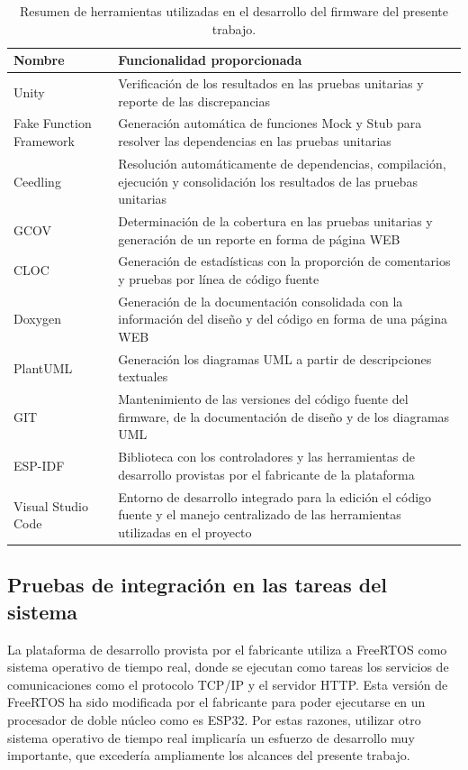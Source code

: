 \begin{table}[ht]
	\centering
	\caption[Herramientas utilizadas para el desarrollo del firmware]{Resumen de herramientas utilizadas en el desarrollo del firmware del presente trabajo.}
	\begin{tabular}{L{25mm} L{100mm}}    
		\toprule
		\textbf{Nombre} & 
		\textbf{Funcionalidad proporcionada} \\
		\midrule
		Unity & 
		Verificación de los resultados en las pruebas unitarias y reporte de las discrepancias \\
		Fake Function Framework &
		Generación automática de funciones Mock y Stub para resolver las dependencias en las pruebas unitarias \\
		Ceedling &
		Resolución automáticamente de dependencias, compilación, ejecución y consolidación los resultados de las pruebas unitarias \\
		GCOV &
		Determinación de la cobertura en las pruebas unitarias y generación de un reporte en forma de página WEB \\
		CLOC &
		Generación de estadísticas con la proporción de comentarios y pruebas por línea de código fuente \\
		Doxygen &
		Generación de la documentación consolidada con la información del diseño y del código en forma de una página WEB \\
		PlantUML &
		Generación los diagramas UML a partir de descripciones textuales \\
		GIT &
		Mantenimiento de las versiones del código fuente del firmware, de la documentación de diseño y de los diagramas UML \\
		ESP-IDF &
		Biblioteca con los controladores y las herramientas de desarrollo provistas por el fabricante de la plataforma \\
		Visual Studio Code &
		Entorno de desarrollo integrado para la edición el código fuente y el manejo centralizado de las herramientas utilizadas en el proyecto \\
		\bottomrule
		\hline
	\end{tabular}
	\label{tab:HerramientasDesarrollo}
\end{table}

\subsection{Pruebas de integración en las tareas del sistema}

La plataforma de desarrollo provista por el fabricante utiliza a FreeRTOS como sistema operativo de tiempo real, donde se ejecutan como tareas los servicios de comunicaciones como el protocolo TCP/IP y el servidor HTTP. Esta versión de FreeRTOS ha sido modificada por el fabricante para poder ejecutarse en un procesador de doble núcleo como es ESP32. Por estas razones, utilizar otro sistema operativo de tiempo real implicaría un esfuerzo de desarrollo muy importante, que excedería ampliamente los alcances del presente trabajo. 

